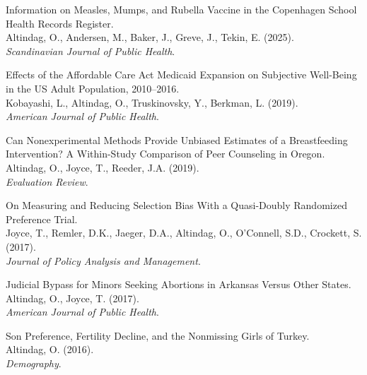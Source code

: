 \documentclass[12pt]{article}
\newcommand{\papertitle}[1]{#1} %
\begin{document}
\smallskip
\noindent\begin{minipage}{\linewidth}
\papertitle{Information on Measles, Mumps, and Rubella Vaccine in the Copenhagen School Health Records Register.} \\
Altindag, O., Andersen, M., Baker, J., Greve, J., Tekin, E. (2025). \\
\textit{Scandinavian Journal of Public Health}.
\end{minipage}

\smallskip
\noindent\begin{minipage}{\linewidth}
\papertitle{Effects of the Affordable Care Act Medicaid Expansion on Subjective Well-Being in the US Adult Population, 2010--2016.} \\
Kobayashi, L., Altindag, O., Truskinovsky, Y., Berkman, L. (2019). \\
\textit{American Journal of Public Health}.
\end{minipage}

\smallskip
\noindent\begin{minipage}{\linewidth}
\papertitle{Can Nonexperimental Methods Provide Unbiased Estimates of a Breastfeeding Intervention? A Within-Study Comparison of Peer Counseling in Oregon.} \\
Altindag, O., Joyce, T., Reeder, J.A. (2019). \\
\textit{Evaluation Review}.
\end{minipage}

\smallskip
\noindent\begin{minipage}{\linewidth}
\papertitle{On Measuring and Reducing Selection Bias With a Quasi-Doubly Randomized Preference Trial.} \\
Joyce, T., Remler, D.K., Jaeger, D.A., Altindag, O., O'Connell, S.D., Crockett, S. (2017). \\
\textit{Journal of Policy Analysis and Management}.
\end{minipage}

\smallskip
\noindent\begin{minipage}{\linewidth}
\papertitle{Judicial Bypass for Minors Seeking Abortions in Arkansas Versus Other States.} \\
Altindag, O., Joyce, T. (2017). \\
\textit{American Journal of Public Health}.
\end{minipage}

\smallskip
\noindent\begin{minipage}{\linewidth}
\papertitle{Son Preference, Fertility Decline, and the Nonmissing Girls of Turkey.} \\
Altindag, O. (2016). \\
\textit{Demography}.
\end{minipage}
\end{document}
